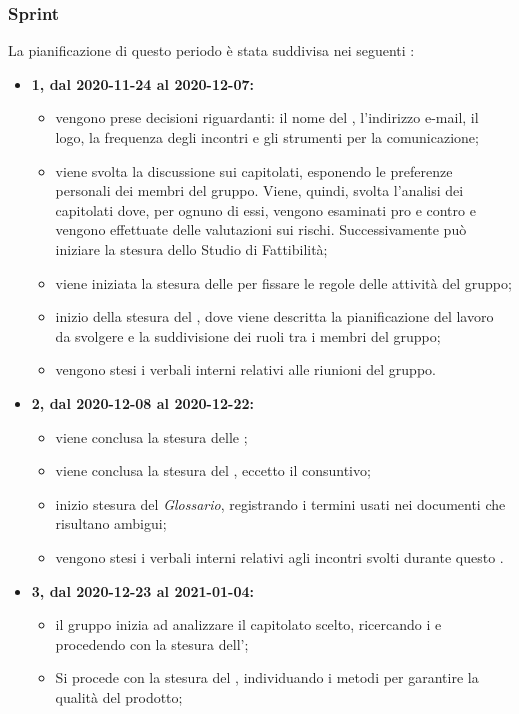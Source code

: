\subsubsection{Sprint}
La pianificazione di questo periodo è stata suddivisa nei seguenti :
\begin{itemize}
	\item \textbf{ 1, dal 2020-11-24 al 2020-12-07:}
	\begin{itemize}
	\item vengono prese decisioni riguardanti: il nome del , l'indirizzo e-mail, il logo, la frequenza degli incontri e gli strumenti per la comunicazione;
	\item viene svolta la discussione sui capitolati, esponendo le preferenze personali dei membri del gruppo. Viene, quindi, svolta l'analisi dei capitolati dove, per ognuno di essi, vengono esaminati pro e contro e vengono effettuate delle valutazioni sui rischi. Successivamente può iniziare la stesura dello Studio di Fattibilità;
	\item viene iniziata la stesura delle \NdP{} per fissare le regole delle attività del gruppo;
	\item inizio della stesura del \PdP{}, dove viene descritta la pianificazione del lavoro da svolgere e la suddivisione dei ruoli tra i membri del gruppo;
	\item vengono stesi i verbali interni relativi alle riunioni del gruppo.
	\end{itemize}
	\item \textbf{ 2, dal 2020-12-08 al 2020-12-22:}
	\begin{itemize}
		\item viene conclusa la stesura delle \NdP{} ;
		\item viene conclusa la stesura del \PdP{}, eccetto il consuntivo;
		\item inizio stesura del \textit{Glossario}, registrando i termini usati nei documenti che risultano ambigui;
		\item vengono stesi i verbali interni relativi agli incontri svolti durante questo .
	\end{itemize}
	\item \textbf{ 3, dal 2020-12-23 al 2021-01-04:}
	\begin{itemize}
		\item il gruppo inizia ad analizzare il capitolato scelto, ricercando i  e procedendo con la stesura dell'\AdR{};
		\item Si procede con la stesura del \PdQ{}, individuando i metodi per garantire la qualità del prodotto;

\end{itemize}
\end{itemize}
